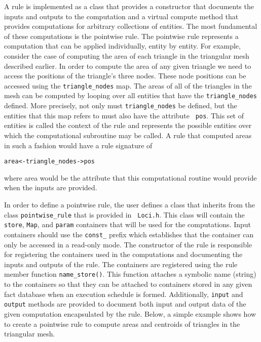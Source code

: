 \documentclass[10pt,epsf]{book}
\begin{document}
A rule is implemented as a class that provides a constructor that
documents the inputs and outputs to the computation and a virtual
compute method that provides computations for arbitrary collections of
entities.  The most fundamental of these computations is the pointwise
rule.  The pointwise rule represents a computation that can be applied
individually, entity by entity.  For example, consider the case of
computing the area of each triangle in the triangular mesh described
earlier.  In order to compute the area of any given triangle we need
to access the positions of the triangle's three nodes.  These node
positions can be accessed using the {\tt triangle\_nodes} map.  The
areas of all of the triangles in the mesh can be computed by looping
over all entities that have the {\tt triangle\_nodes} defined.  More
precisely, not only must {\tt triangle\_nodes} be defined, but the
entities that this map refers to must also have the attribute {\tt
  pos}.  This set of entities is called the context of the rule and
represents the possible entities over which the computational
subroutine may be called.  A rule that computed areas in such a
fashion would have a rule signature of
\begin{verbatim}
area<-triangle_nodes->pos
\end{verbatim}
where area would be the attribute that this computational routine
would provide when the inputs are provided.  

In order to define a pointwise rule, the user defines a class that
inherits from the class {\tt pointwise\_rule} that is provided in {\tt
  Loci.h}.  This class will contain the {\tt store}, {\tt Map}, and
{\tt param} containers that will be used for the computations.  Input
containers should use the {\tt const\_} prefix which establishes that
the container can only be accessed in a read-only mode.  The
constructor of the rule is responsible for registering the containers
used in the computations and documenting the inputs and outputs of the
rule.  The containers are registered using the rule member function
{\tt name\_store()}.  This function attaches a symbolic name (string)
to the containers so that they can be attached to containers stored in
any given fact database when an execution schedule is formed.
Additionally, {\tt input} and {\tt output} methods are provided to
document both input and output data of the given computation
encapsulated by the rule.  Below, a simple example shows how to create
a pointwise rule to compute areas and centroids of triangles in the
triangular mesh.
\end{document}
